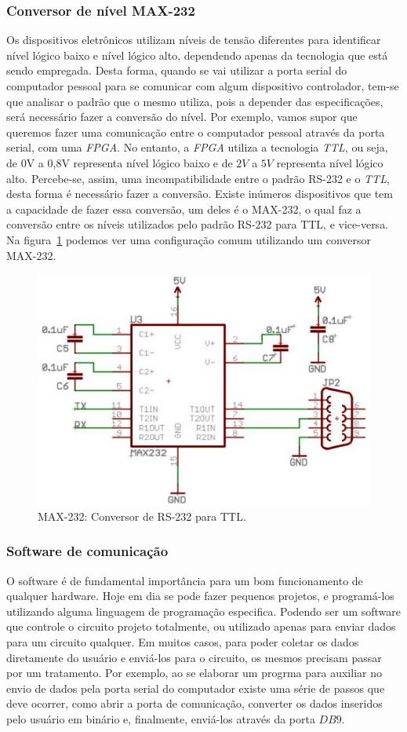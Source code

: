\documentclass[12pt]{article}
\begin{document}
\subsubsection{Conversor de nível MAX-232}
Os dispositivos eletrônicos utilizam níveis de tensão diferentes para identificar nível lógico baixo e nível lógico alto, dependendo apenas da tecnologia que está sendo empregada. Desta forma, quando se vai utilizar a porta serial do computador pessoal para se comunicar com algum dispositivo controlador, tem-se que analisar o padrão que o mesmo utiliza, pois a depender das especificações, será necessário fazer a conversão do nível. Por exemplo, vamos supor que queremos fazer uma comunicação entre o computador pessoal através da porta serial, com uma \textit{FPGA}. No entanto, a \textit{FPGA} utiliza a tecnologia \textit{TTL}, ou seja, de 0V a 0,8V representa nível lógico baixo e de $2V$ a $5V$ representa nível lógico alto. Percebe-se, assim, uma incompatibilidade entre o padrão RS-232 e o \textit{TTL}, desta forma é necessário fazer a conversão. Existe inúmeros dispositivos que tem a capacidade de fazer essa conversão, um deles é o MAX-232, o qual faz  a conversão entre os níveis utilizados pelo padrão RS-232 para TTL, e vice-versa. Na figura~\ref{fig:232} podemos ver uma configuração comum utilizando um conversor MAX-232. 

\begin{figure}[h]
\centering
\includegraphics[width=.5\textwidth]{img/Fig11-microcontroller_uart_max232_circuit.jpg}
\caption{MAX-232: Conversor de RS-232 para TTL.}
\label{fig:232}
\end{figure}

\subsubsection{Software de comunicação}

O software é de fundamental importância para um bom funcionamento de qualquer hardware. Hoje em dia se pode fazer pequenos projetos, e programá-los utilizando alguma linguagem de programação especifica. Podendo ser um software que controle o circuito projeto totalmente, ou utilizado apenas para enviar dados para um circuito qualquer. Em muitos casos, para poder coletar os dados diretamente do usuário e enviá-los para o circuito, os mesmos precisam passar por um tratamento. Por exemplo, ao se elaborar um progrma para auxiliar no envio de dados pela porta serial do computador existe uma série de passos que deve ocorrer, como abrir a porta de comunicação, converter os dados inseridos pelo usuário em binário e, finalmente, enviá-los através da porta $DB9$.
\end{document}
